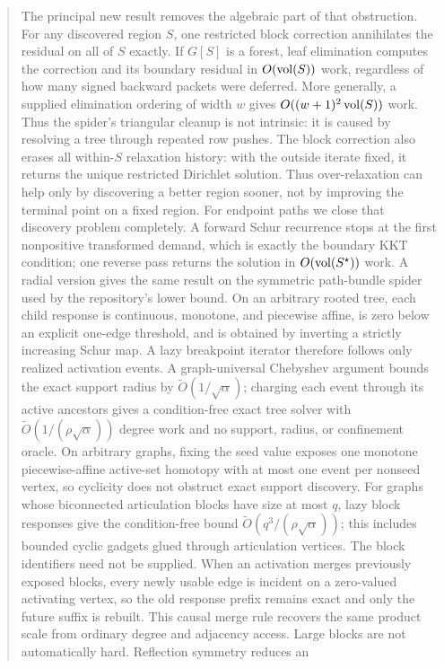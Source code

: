 \documentclass[11pt]{article}
\begin{document}
\begin{abstract}
The principal new result removes the algebraic part of that obstruction.
For any discovered region $S$, one restricted block correction annihilates
the residual on all of $S$ exactly.  If $G[S]$ is a forest, leaf elimination
computes the correction and its boundary residual in $O(\vol(S))$ work,
regardless of how many signed backward packets were deferred.  More generally,
a supplied elimination ordering of width $w$ gives
$O((w+1)^2\vol(S))$ work.  Thus the spider's triangular cleanup is not
intrinsic: it is caused by resolving a tree through repeated row pushes.
The block correction also erases all within-$S$ relaxation history: with the
outside iterate fixed, it returns the unique restricted Dirichlet solution.
Thus over-relaxation can help only by discovering a better region sooner, not
by improving the terminal point on a fixed region.
For endpoint paths we close that discovery problem completely.  A forward
Schur recurrence stops at the first nonpositive transformed demand, which is
exactly the boundary KKT condition; one reverse pass returns the solution in
$O(\vol(S^\star))$ work.  A radial version gives the same result on the
symmetric path-bundle spider used by the repository's lower bound.
On an arbitrary rooted tree, each child response is continuous, monotone, and
piecewise affine, is zero below an explicit one-edge threshold, and is obtained
by inverting a strictly increasing Schur map.  A lazy breakpoint iterator
therefore follows only realized activation events.  A graph-universal
Chebyshev argument bounds the exact support radius by
$\widetilde O(1/\sqrt\alpha)$; charging each event through its active ancestors
gives a condition-free exact tree solver with
$\widetilde O(1/(\rho\sqrt\alpha))$ degree work and no support, radius, or
confinement oracle.
On arbitrary graphs, fixing the seed value exposes one monotone
piecewise-affine active-set homotopy with at most one event per nonseed vertex,
so cyclicity does not obstruct exact support discovery.  For graphs whose
biconnected articulation blocks have size at most $q$, lazy block responses
give the condition-free bound
$\widetilde O(q^3/(\rho\sqrt\alpha))$; this includes bounded cyclic gadgets
glued through articulation vertices.  The block identifiers need not be
supplied.  When an activation merges previously exposed blocks, every newly
usable edge is incident on a zero-valued activating vertex, so the old
response prefix remains exact and only the future suffix is rebuilt.  This
causal merge rule recovers the same product scale from ordinary degree and
adjacency access.
Large blocks are not automatically hard.  Reflection symmetry reduces an

\end{abstract}
\end{document}
